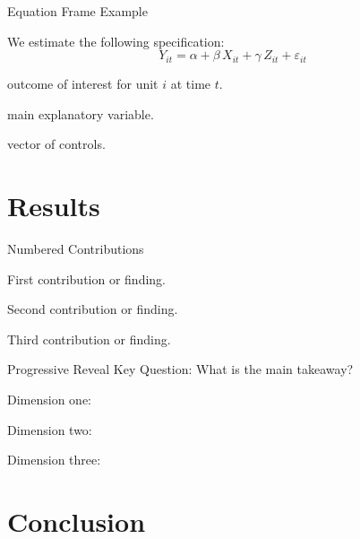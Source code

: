 \documentclass[9pt, aspectratio=169]{beamer}
\newenvironment{wideitemize}{%
  \setlength{\leftmargini}{1em}%
  \setlength{\leftmarginii}{1.5em}%
  \itemize\addtolength{\itemsep}{2pt}}%
  {\enditemize}
\newenvironment{widenumerate}{%
  \setlength{\leftmargini}{1.5em}%
  \setlength{\leftmarginii}{2em}%
  \enumerate\addtolength{\itemsep}{3pt}}%
  {\endenumerate}
\begin{document}
\begin{frame}{Equation Frame Example}
  \begin{wideitemize}
    \item We estimate the following specification:
  \end{wideitemize}
  \vspace{3mm}
  \begin{equation*}
    Y_{it} = \alpha + \beta\, X_{it} + \gamma\, Z_{it} + \varepsilon_{it}
  \end{equation*}
  \vspace{3mm}
  \begin{wideitemize}
    \item[$Y_{it}$:] outcome of interest for unit $i$ at time $t$.
    \item[$X_{it}$:] main explanatory variable.
    \item[$Z_{it}$:] vector of controls.
  \end{wideitemize}
\end{frame}


\section{Results}

\begin{frame}{Numbered Contributions}
  \begin{widenumerate}
    \item First contribution or finding.
    \item Second contribution or finding.
    \item Third contribution or finding.
  \end{widenumerate}
\end{frame}

\begin{frame}{Progressive Reveal}
  \textcolor{accent}{Key Question:} What is the main takeaway?
  \begin{wideitemize}
    \item Dimension one: \onslide<2>{revealed answer.}
    \item Dimension two: 
    \item Dimension three: 
  \end{wideitemize}
\end{frame}


\section{Conclusion}
\end{document}
